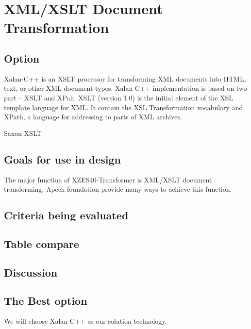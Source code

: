\section{XML/XSLT Document Transformation}

\subsection{Option}
Xalan-C++ is an XSLT processor for transforming XML documents into HTML, text, or other XML document types. Xalan-C++ implementation is based on two part -- XSLT and XPah. XSLT (version 1.0) is the initial element of the XSL template language for XML. It contain the XSL Transformation vocabulary and XPath, a language for addressing to parts of XML archives.

Saxon XSLT

\subsection{Goals for use in design}
The major function of XZES40-Transformer is XML/XSLT document transforming. Apech foundation provide many ways to achieve this function.

\subsection{Criteria being evaluated}

\subsection{Table compare}
%	
%	

\subsection{Discussion}

\subsection{The Best option}
We will choose Xalan-C++ as our solution technology.


